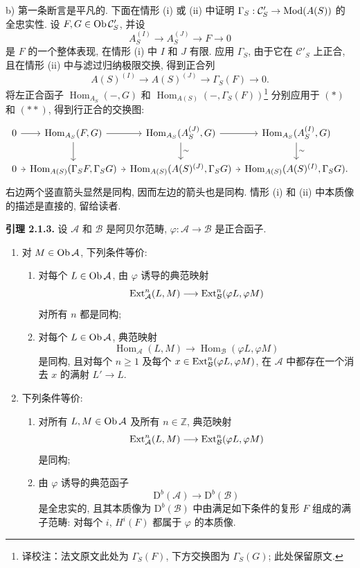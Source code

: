 b) 第一条断言是平凡的. 下面在情形 (i) 或 (ii) 中证明 $\Gamma_S:\mathcal C'_S\to\operatorname{Mod}(A(S))$ 的全忠实性. 设 $F,G\in\operatorname{Ob}\mathcal C'_S$, 并设
\[
A_S^{(I)}\longrightarrow A_S^{(J)}\longrightarrow F\longrightarrow0
\tag{$*$}
\]
是 $F$ 的一个整体表现, 在情形 (i) 中 $I$ 和 $J$ 有限. 应用 $\Gamma_S$, 由于它在 $\mathcal C'_S$ 上正合, 且在情形 (ii) 中与滤过归纳极限交换, 得到正合列
\[
A(S)^{(I)}\longrightarrow A(S)^{(J)}\longrightarrow\Gamma_S(F)\longrightarrow0.
\tag{$**$}
\]
将左正合函子 $\operatorname{Hom}_{A_S}(-,G)$ 和 $\operatorname{Hom}_{A(S)}(-,\Gamma_S(F))$\footnote{译校注：法文原文此处为 $\Gamma_S(F)$, 下方交换图为 $\Gamma_S(G)$; 此处保留原文.} 分别应用于 $(*)$ 和 $(**)$, 得到行正合的交换图:
\[
\begin{tikzcd}[column sep=0.5em]
0 \arrow[r] & \operatorname{Hom}_{A_S}(F,G) \arrow[r] \arrow[d] &
\operatorname{Hom}_{A_S}(A_S^{(J)},G) \arrow[r] \arrow[d,"\sim"] &
\operatorname{Hom}_{A_S}(A_S^{(I)},G) \arrow[d,"\sim"] \\
0 \arrow[r] & \operatorname{Hom}_{A(S)}(\Gamma_SF,\Gamma_SG) \arrow[r] &
\operatorname{Hom}_{A(S)}(A(S)^{(J)},\Gamma_SG) \arrow[r] &
\operatorname{Hom}_{A(S)}(A(S)^{(I)},\Gamma_SG).
\end{tikzcd}
\]
右边两个竖直箭头显然是同构, 因而左边的箭头也是同构. 情形 (i) 和 (ii) 中本质像的描述是直接的, 留给读者.

\textbf{引理 2.1.3.} 设 $\mathcal A$ 和 $\mathcal B$ 是阿贝尔范畴, $\varphi:\mathcal A\to\mathcal B$ 是正合函子.
\begin{enumerate}[label=\alph*)]
\item 对 $M\in\operatorname{Ob}\mathcal A$, 下列条件等价:
\begin{enumerate}[label=(\roman*)]
\item 对每个 $L\in\operatorname{Ob}\mathcal A$, 由 $\varphi$ 诱导的典范映射
\[
\operatorname{Ext}^n_{\mathcal A}(L,M)\longrightarrow\operatorname{Ext}^n_{\mathcal B}(\varphi L,\varphi M)
\]
对所有 $n$ 都是同构;
\item 对每个 $L\in\operatorname{Ob}\mathcal A$, 典范映射
\[
\operatorname{Hom}_{\mathcal A}(L,M)\longrightarrow\operatorname{Hom}_{\mathcal B}(\varphi L,\varphi M)
\]
是同构, 且对每个 $n\ge1$ 及每个 $x\in\operatorname{Ext}^n_{\mathcal B}(\varphi L,\varphi M)$, 在 $\mathcal A$ 中都存在一个消去 $x$ 的满射 $L'\to L$.
\end{enumerate}
\item 下列条件等价:
\begin{enumerate}[label=(\roman*)]
\item 对所有 $L,M\in\operatorname{Ob}\mathcal A$ 及所有 $n\in\mathbb Z$, 典范映射
\[
\operatorname{Ext}^n_{\mathcal A}(L,M)\longrightarrow\operatorname{Ext}^n_{\mathcal B}(\varphi L,\varphi M)
\]
是同构;
\item 由 $\varphi$ 诱导的典范函子
\[
\mathrm D^b(\mathcal A)\longrightarrow\mathrm D^b(\mathcal B)
\]
是全忠实的, 且其本质像为 $\mathrm D^b(\mathcal B)$ 中由满足如下条件的复形 $F$ 组成的满子范畴: 对每个 $i$, $H^i(F)$ 都属于 $\varphi$ 的本质像.
\end{enumerate}
\end{enumerate}

